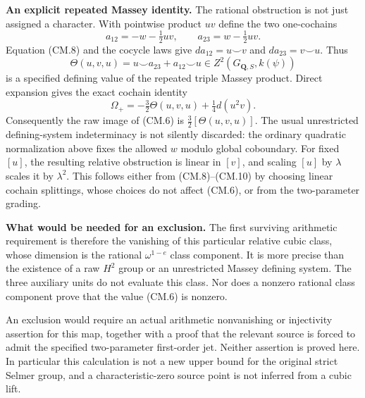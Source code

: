 \documentclass[11pt,a4paper]{article}
\theoremstyle{definition}
\renewcommand{\paragraph}[1]{\par\smallskip\noindent\textbf{#1}\quad\ignorespaces}
\begin{document}
\paragraph{An explicit repeated Massey identity.}
The rational obstruction is not just assigned a character.
With pointwise product $uv$ define the two one-cochains
\[
 a_{12}=-w-\tfrac12uv,\qquad
 a_{23}=w-\tfrac12uv.
                                                               \tag{CM.19}
\]
Equation (CM.8) and the cocycle laws give
$da_{12}=u\smile v$ and $da_{23}=v\smile u$.
Thus
\[
 \Theta(u,v,u)=u\smile a_{23}+a_{12}\smile u
                      \in Z^2(G_{\mathbf Q,S},k(\psi))
                                                               \tag{CM.20}
\]
is a specified defining value of the repeated triple
Massey product.  Direct expansion gives the exact cochain
identity
\[
             \Omega_+=-\tfrac32\Theta(u,v,u)
                               +\tfrac14d(u^2v).              \tag{CM.21}
\]
Consequently the raw image of (CM.6) is
$\tfrac32[\Theta(u,v,u)]$.
The usual unrestricted defining-system indeterminacy is not
silently discarded: the ordinary quadratic normalization
above fixes the allowed $w$ modulo global coboundary.
For fixed $[u]$, the resulting relative obstruction is linear
in $[v]$, and scaling $[u]$ by $\lambda$ scales it by
$\lambda^2$.  This follows either from (CM.8)--(CM.10) by
choosing linear cochain splittings, whose choices do not
affect (CM.6), or from the two-parameter grading.

\paragraph{What would be needed for an exclusion.}
The first surviving arithmetic requirement is therefore
the vanishing of this particular relative cubic class,
whose dimension is the rational $\omega^{1-e}$ class
component.  It is more precise than the existence of a
raw $H^2$ group or an unrestricted Massey defining system.
The three auxiliary units do not evaluate this class.
Nor does a nonzero rational class component prove that
the value (CM.6) is nonzero.

An exclusion would require an actual arithmetic
nonvanishing or injectivity assertion for this map,
together with a proof that the relevant source is forced
to admit the specified two-parameter first-order jet.
Neither assertion is proved here.  In particular this
calculation is not a new upper bound for the original
strict Selmer group, and a characteristic-zero source
point is not inferred from a cubic lift.
\end{document}
